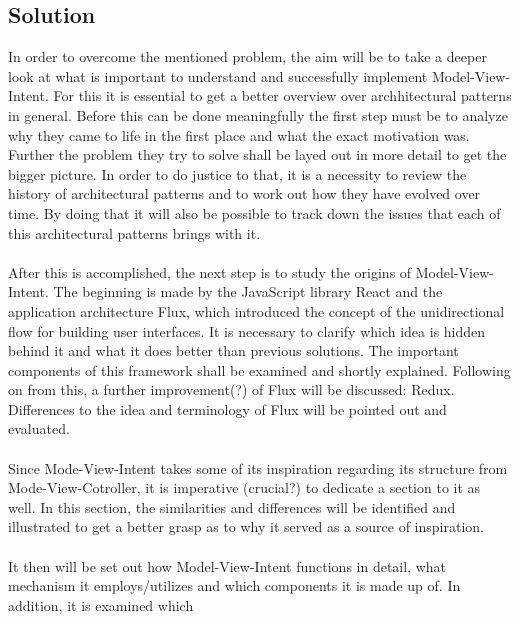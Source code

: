 \subsection{Solution}
\label{subsec:solution}


In order to overcome the mentioned problem, the aim will be to take a deeper look at what is important to understand and successfully implement Model-View-Intent.
For this it is essential to get a better overview over archhitectural patterns in general. Before this can be done meaningfully the first step must be 
to analyze why they came to life in the first place and what the exact motivation was. Further the problem they try to solve shall be layed out in more detail to 
get the bigger picture. In order to do justice to that, it is a necessity to review the history of architectural patterns and to work out how they have evolved over time.
By doing that it will also be possible to track down the issues that each of this architectural patterns brings with it.
\\
\\
After this is accomplished, the next step is to study the origins of Model-View-Intent. The beginning is made by the JavaScript library React and the application architecture
Flux, which introduced the concept of the unidirectional flow for building user interfaces. It is necessary to clarify which idea is hidden behind it and what it does
better than previous solutions. The important components of this framework shall be examined and shortly explained. Following on from this, a further improvement(?) of Flux will 
be discussed: Redux. Differences to the idea and terminology of Flux will be pointed out and evaluated.
\\
\\
Since Mode-View-Intent takes some of its inspiration regarding its structure from Mode-View-Cotroller, it is imperative (crucial?) to dedicate a section to it as well.
In this section, the similarities and differences will be identified and illustrated to get a better grasp as to why it served as a source of inspiration.
\\
\\
It then will be set out how Model-View-Intent functions in detail, what mechanism it employs/utilizes and which components it is made up of. In addition, it is examined which 
